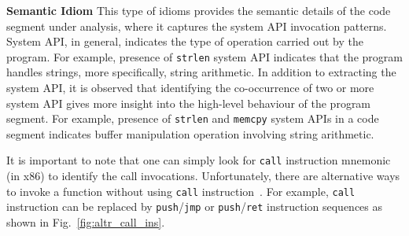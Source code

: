 %

\noindent \textbf{Semantic Idiom}
This type of idioms provides the semantic details of the code segment under analysis, where it captures the system API invocation patterns. System API, in general, indicates the type of operation carried out by the program. For example, presence of \texttt{strlen} system API indicates that the program handles strings, more specifically, string arithmetic. In addition to extracting the system API, it is observed that identifying the co-occurrence of two or more system API gives more insight into the high-level behaviour of the program segment. For example, presence of \texttt{strlen} and \texttt{memcpy} system APIs in a code segment indicates buffer manipulation operation involving string arithmetic.

It is important to note that one can simply look for \texttt{call} instruction mnemonic (in x86) to identify the call invocations. Unfortunately, there are alternative ways to invoke a function without using \texttt{call} instruction~\cite{lakhotia2004abstracting}. For example, \texttt{call} instruction can be replaced by \texttt{push}/\texttt{jmp} or \texttt{push}/\texttt{ret} instruction sequences as shown in Fig.~\ref{fig:altr_call_ins}.

